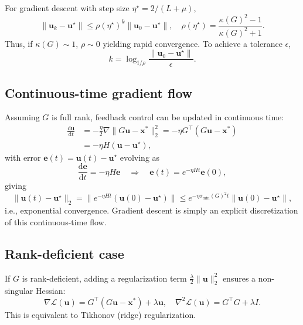 \documentclass[11pt,twoside]{article}
\theoremstyle{plain}
\theoremstyle{definition}
\theoremstyle{remark}
\newcommand{\vect}[1]{\boldsymbol{#1}}
\begin{document}
For gradient descent with step size \(\eta^\star = 2/(L+\mu)\),
\begin{equation}
    \|\vect{u}_k - \vect{u}^\star\| \le \rho(\eta^\star)^k \|\vect{u}_0 - \vect{u}^\star\|, \quad \rho(\eta^\star) = \frac{\kappa(G)^2 - 1}{\kappa(G)^2 + 1}.
\end{equation}
Thus, if \(\kappa(G) \sim 1\), \(\rho \sim 0\) yielding rapid convergence. To achieve a tolerance \(\epsilon\),
\begin{equation}
    k = \log_{1/\rho} \frac{\|\vect{u}_0 - \vect{u}^\star\|}{\epsilon}.
\end{equation}

\subsection{Continuous-time gradient flow} 
Assuming \(G\) is full rank, feedback control can be updated in continuous time:
\begin{equation}
\begin{split}
    \frac{\mathrm{d}\vect{u}}{\mathrm{d}t} &= -\frac{\eta}{2} \nabla \|G\vect{u} - \vect{x}^*\|_2^2 = -\eta G^\intercal(G\vect{u} - \vect{x}^*) \\
           &= -\eta H(\vect{u} - \vect{u}^\star),
\end{split}
\end{equation}
with error \(\vect{e}(t) = \vect{u}(t) - \vect{u}^\star\) evolving as
\begin{equation}
    \frac{\mathrm{d}\vect{e}}{\mathrm{d}t} = -\eta H \vect{e} \quad \Rightarrow \quad \vect{e}(t) = e^{-\eta H t} \vect{e}(0),
\end{equation}
giving
\begin{equation}
    \|\vect{u}(t) - \vect{u}^\star\|_2 = \|e^{-\eta H t} (\vect{u}(0) - \vect{u}^\star)\| \le e^{-\eta \sigma_{\min}(G)^2 t} \|\vect{u}(0) - \vect{u}^\star\|,
\end{equation}
i.e., exponential convergence. Gradient descent is simply an explicit discretization of this continuous-time flow.

\subsection{Rank-deficient case} 
If \(G\) is rank-deficient, adding a regularization term \( \frac{\lambda}{2} \|\vect{u}\|_2^2 \) ensures a non-singular Hessian:
\begin{equation}
    \nabla \mathcal{L}(\vect{u}) = G^\intercal (G\vect{u} - \vect{x}^*) + \lambda \vect{u}, \quad \nabla^2 \mathcal{L}(\vect{u}) = G^\intercal G + \lambda I.
\end{equation}
This is equivalent to Tikhonov (ridge) regularization.
\end{document}
